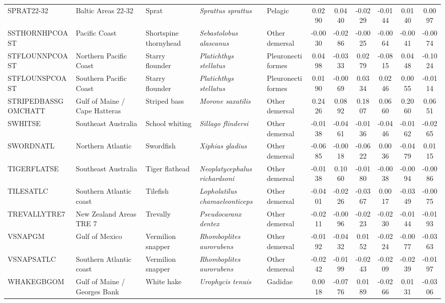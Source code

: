 \begin{longtable}{p{3cm}p{3cm}lllcccccc}
  SPRAT22-32 & Baltic Areas 22-32 & Sprat & \textit{Sprattus sprattus} & Pelagic & 0.0290 & 0.0440 & -0.0229 & -0.0144 & 0.0140 & 0.0097 \\
  SSTHORNHPCOAST & Pacific Coast & Shortspine thornyhead & \textit{Sebastolobus alascanus} & Other demersal & -0.0030 & -0.0286 & -0.0025 & -0.0064 & -0.0041 & -0.0074 \\
  STFLOUNNPCOAST & Northern Pacific Coast & Starry flounder & \textit{Platichthys stellatus} & Pleuronectiformes & 0.0498 & -0.0333 & 0.0279 & -0.0815 & 0.0448 & -0.1024 \\
  STFLOUNSPCOAST & Southern Pacific Coast & Starry flounder & \textit{Platichthys stellatus} & Pleuronectiformes & 0.0190 & -0.0069 & 0.0334 & 0.0246 & 0.0055 & -0.0114 \\
  STRIPEDBASSGOMCHATT & Gulf of Maine / Cape Hatteras & Striped bass & \textit{Morone saxatilis} & Other demersal & 0.2426 & 0.0892 & 0.1807 & 0.0660 & 0.2060 & 0.0651 \\
  SWHITSE & Southeast Australia & School whiting & \textit{Sillago flindersi} & Other demersal & -0.0138 & -0.0461 & -0.0136 & -0.0446 & -0.0162 & -0.0265 \\
  SWORDNATL & Northern Atlantic & Swordfish & \textit{Xiphias gladius} & Other demersal & -0.0685 & -0.0018 & -0.0622 & 0.0036 & -0.0479 & 0.0115 \\
  TIGERFLATSE & Southeast Australia & Tiger flathead & \textit{Neoplatycephalus richardsoni} & Other demersal & -0.0138 & 0.1060 & -0.0180 & -0.0038 & -0.0094 & -0.0086 \\
  TILESATLC & Southern Atlantic coast & Tilefish & \textit{Lopholatilus chamaeleonticeps} & Other demersal & -0.0401 & -0.0226 & -0.0367 & 0.0017 & -0.0349 & -0.0075 \\
  TREVALLYTRE7 & New Zealand Areas TRE 7 & Trevally & \textit{Pseudocaranx dentex} & Other demersal & -0.0211 & -0.0096 & -0.0223 & -0.0230 & -0.0144 & -0.0193 \\
  VSNAPGM & Gulf of Mexico & Vermilion snapper & \textit{Rhomboplites aurorubens} & Other demersal & -0.0192 & -0.0432 & 0.0152 & -0.0224 & -0.0077 & -0.0363 \\
  VSNAPSATLC & Southern Atlantic coast & Vermilion snapper & \textit{Rhomboplites aurorubens} & Other demersal & -0.0242 & -0.0199 & -0.0243 & -0.0209 & -0.0239 & -0.0197 \\
  WHAKEGBGOM & Gulf of Maine / Georges Bank & White hake & \textit{Urophycis tenuis} & Gadidae & 0.0018 & -0.0776 & 0.0189 & -0.0266 & 0.0131 & -0.0306 \\

\end{longtable}
